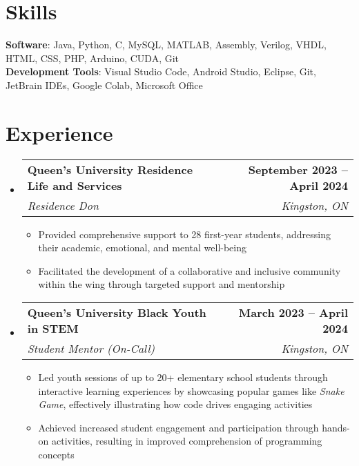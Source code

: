 \documentclass[letterpaper,11pt]{article}
\makeatletter
\newcommand{\resumeItem}[1]{
  \item\small{
    {#1 \vspace{-2pt}}
  }
}
\newcommand{\resumeSubheading}[4]{
  \vspace{-2pt}\item
    \begin{tabular*}{1.0\textwidth}[t]{l@{\extracolsep{\fill}}r}
      \textbf{#1} & \textbf{\small #2} \\
      \textit{\small#3} & \textit{\small #4} \\
    \end{tabular*}\vspace{-7pt}
}
\newcommand{\resumeSubHeadingListStart}{\begin{itemize}[leftmargin=0.0in, label={}]}
\newcommand{\resumeSubHeadingListEnd}{\end{itemize}}
\newcommand{\resumeItemListStart}{\begin{itemize}}
\newcommand{\resumeItemListEnd}{\end{itemize}\vspace{-5pt}}
\makeatother
\begin{document}
\section{Skills}
 \begin{itemize}[leftmargin=0.15in, label={}]
    \small{\item{
     \textbf{Software}{: Java, Python, C, MySQL, MATLAB, Assembly, Verilog, VHDL, HTML, CSS, PHP, Arduino, CUDA, Git} \\
    \textbf{Development Tools}{: Visual Studio Code, Android Studio, Eclipse, Git, JetBrain IDEs, Google Colab, Microsoft Office} \\
    }}
 \end{itemize}
 \vspace{-16pt}



\section{Experience}
  \resumeSubHeadingListStart

    \resumeSubheading
      {Queen's University Residence Life and Services}{September 2023 -- April 2024}
      {Residence Don}{Kingston, ON}
      \resumeItemListStart
        \resumeItem{Provided comprehensive support to 28 first-year students, addressing their academic, emotional, and mental well-being}
        \resumeItem{Facilitated the development of a collaborative and inclusive community within the wing through targeted support and mentorship}
      \resumeItemListEnd

    \resumeSubheading
    {Queen's University Black Youth in STEM}{March  2023 -- April 2024}{Student Mentor (On-Call)}{Kingston, ON}
    \resumeItemListStart
        \resumeItem{Led youth sessions of up to 20+ elementary school students through interactive learning experiences by showcasing popular games like \textit{Snake Game}, effectively illustrating how code drives engaging activities}
        \resumeItem{Achieved increased student engagement and participation through hands-on activities, resulting in improved comprehension of programming concepts}
    \resumeItemListEnd
    
  \resumeSubHeadingListEnd
\vspace{-16pt}

\end{document}
